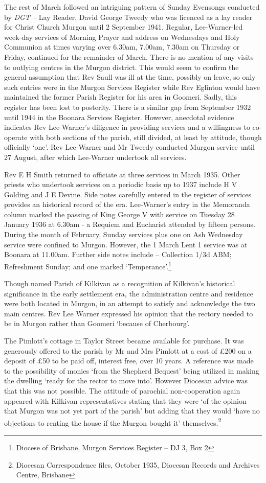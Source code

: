 The rest of March followed an intriguing pattern of Sunday Evensongs
conducted by \emph{DGT --} Lay Reader, David George Tweedy who was
licenced as a lay reader for Christ Church Murgon until 2 September
1941. Regular, Lee-Warner-led week-day services of Morning Prayer and
address on Wednesdays and Holy Communion at times varying over 6.30am,
7.00am, 7.30am on Thursday or Friday, continued for the remainder of
March. There is no mention of any visits to outlying centres in the
Murgon district. This would seem to confirm the general assumption that
Rev Saull was ill at the time, possibly on leave, so only such entries
were in the Murgon Services Register while Rev Eglinton would have
maintained the former Parish Register for his area in Goomeri. Sadly,
this register has been lost to posterity. There is a similar gap from
September 1932 until 1944 in the Boonara Services Register. However,
anecdotal evidence indicates Rev Lee-Warner's diligence in providing
services and a willingness to co-operate with both sections of the
parish, still divided, at least by attitude, though officially `one'.
Rev Lee-Warner and Mr Tweedy conducted Murgon service until 27 August,
after which Lee-Warner undertook all services.

Rev E H Smith returned to officiate at three services in March 1935.
Other priests who undertook services on a periodic basis up to 1937
include H V Golding and J E Devine. Side notes carefully entered in the
register of services provides an historical record of the era.
Lee-Warner's entry in the Memoranda column marked the passing of King
George V with service on Tuesday 28 January 1936 at 6.30am - a Requiem
and Eucharist attended by fifteen persons. During the month of February,
Sunday services plus one on Ash Wednesday service were confined to
Murgon. However, the 1 March Lent 1 service was at Boonara at 11.00am.
Further side notes include -- Collection 1/3d ABM; Refreshment Sunday;
and one marked `Temperance'.\footnote{Diocese of Brisbane, Murgon
  Services Register -- DJ 3, Box 2}

Though named Parish of Kilkivan as a recognition of Kilkivan's
historical significance in the early settlement era, the administration
centre and residence were both located in Murgon, in an attempt to
satisfy and acknowledge the two main centres. Rev Lee Warner expressed
his opinion that the rectory needed to be in Murgon rather than Goomeri
`because of Cherbourg'.

The Pimlott's cottage in Taylor Street became available for purchase. It
was generously offered to the parish by Mr and Mrs Pimlott at a cost of
£200 on a deposit of £50 to be paid off, interest free, over 10 years. A
reference was made to the possibility of monies `from the Shepherd
Bequest' being utilized in making the dwelling `ready for the rector to
move into'. However Diocesan advice was that this was not possible. The
attitude of parochial non-cooperation again appeared with Kilkivan
representatives stating that they were `of the opinion that Murgon was
not yet part of the parish' but adding that they would `have no
objections to renting the house if the Murgon bought it'
themselves.\footnote{Diocesan Correspondence files, October 1935,
  Diocesan Records and Archives Centre, Brisbane}

